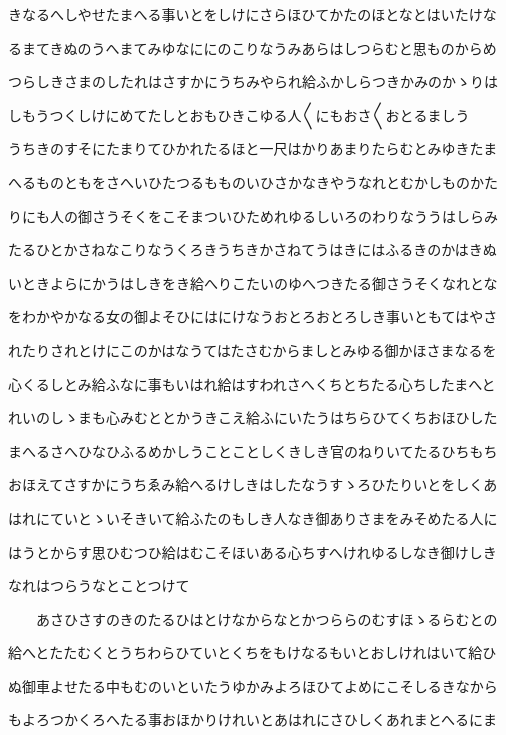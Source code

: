 \documentclass[a4paper,11pt,landscape]{ltjtarticle}
\begin{document}
きなるへしやせたまへる事いとをしけにさらほひてかたのほとなとはいたけな
\par\medskip
るまてきぬのうへまてみゆなににのこりなうみあらはしつらむと思ものからめ
\par\medskip
つらしきさまのしたれはさすかにうちみやられ給ふかしらつきかみのかゝりは
\par\medskip
しもうつくしけにめてたしとおもひきこゆる人〱にもおさ〱おとるましう
\par\medskip
うちきのすそにたまりてひかれたるほと一尺はかりあまりたらむとみゆきたま
\par\medskip
へるものともをさへいひたつるもものいひさかなきやうなれとむかしものかた
\par\medskip
りにも人の御さうそくをこそまついひためれゆるしいろのわりなううはしらみ
\par\medskip
たるひとかさねなこりなうくろきうちきかさねてうはきにはふるきのかはきぬ
\par\medskip
いときよらにかうはしきをき給へりこたいのゆへつきたる御さうそくなれとな
\par\medskip
をわかやかなる女の御よそひにはにけなうおとろおとろしき事いともてはやさ
\par\medskip
れたりされとけにこのかはなうてはたさむからましとみゆる御かほさまなるを
\par\medskip
心くるしとみ給ふなに事もいはれ給はすわれさへくちとちたる心ちしたまへと
\par\medskip
れいのしゝまも心みむととかうきこえ給ふにいたうはちらひてくちおほひした
\par\medskip
まへるさへひなひふるめかしうことことしくきしき官のねりいてたるひちもち
\par\medskip
おほえてさすかにうちゑみ給へるけしきはしたなうすゝろひたりいとをしくあ
\par\medskip
はれにていとゝいそきいて給ふたのもしき人なき御ありさまをみそめたる人に
\par\medskip
はうとからす思ひむつひ給はむこそほいある心ちすへけれゆるしなき御けしき
\par\medskip
なれはつらうなとことつけて
\par\medskip
　　あさひさすのきのたるひはとけなからなとかつららのむすほゝるらむとの
\par\medskip
給へとたたむくとうちわらひていとくちをもけなるもいとおしけれはいて給ひ
\par\medskip
ぬ御車よせたる中もむのいといたうゆかみよろほひてよめにこそしるきなから
\par\medskip
もよろつかくろへたる事おほかりけれいとあはれにさひしくあれまとへるにま
\end{document}

